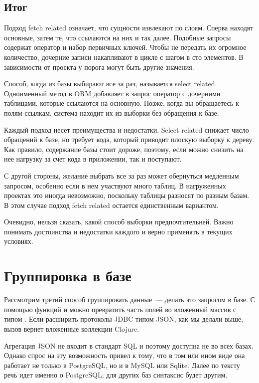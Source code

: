 \subsection{Итог}

Подход fetch related означает, что сущности извлекают по слоям. Сперва находят основные, затем те, что ссылаются на них и так далее. Подобные запросы содержат оператор  и набор первичных ключей. Чтобы не передать их огромное количество, дочерние записи накапливают в цикле с шагом в сто элементов. В зависимости от проекта у порога могут быть другие значения.

Способ, когда из базы выбирают все за раз, называется select related. Одноименный метод в ORM добавляет в запрос оператор  с дочерними таблицами, которые ссылаются на основную. Позже, когда вы обращаетесь к полям-ссылкам, система находит их из выборки без обращения к базе.

Каждый подход несет преимущества и недостатки. Select related снижает число обращений к базе, но требует кода, который приводит плоскую выборку к дереву. Как правило, содержание базы стоит дороже, поэтому, если можно снизить на нее нагрузку за счет кода в приложении, так и поступают.

С другой стороны, желание выбрать все за раз может обернуться медленным запросом, особенно если в нем участвуют много таблиц. В нагруженных проектах это иногда невозможно, поскольку таблицы разносят по разным базам. В этом случае подход fetch related остается единственным вариантом.

Очевидно, нельзя сказать, какой способ выборки предпочтительней. Важно понимать достоинства и недостатки каждого и верно применять в текущих условиях.

\section{Группировка в базе}

Рассмотрим третий способ группировать данные~--- делать это запросом в базе. С помощью функций  и  можно превратить часть полей во вложенный массив с типом . Если расширить протоколы JDBC типом JSON, как мы делали выше, вызов  вернет вложенные коллекции Clojure.

Агрегация JSON не входит в стандарт SQL и поэтому доступна не во всех базах. Однако спрос на эту возможность привел к тому, что в том или ином виде она работает не только в PostgreSQL, но и в MySQL или Sqlite. Далее по тексту речь идет именно о PostgreSQL; для других баз синтаксис будет другим.

